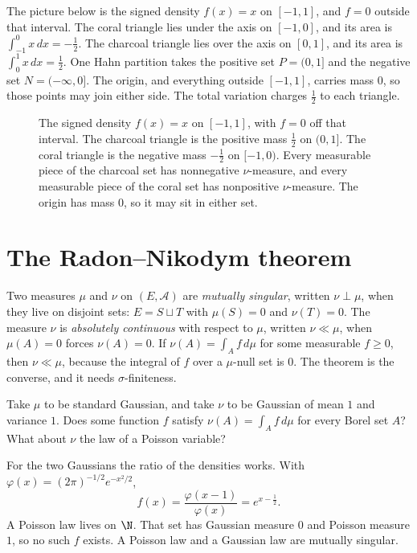 The picture below is the signed density $f(x)=x$ on $[-1,1]$, and $f=0$ outside that interval. The coral triangle lies under the axis on $[-1,0]$, and its area is $\int_{-1}^0 x\,dx=-\frac12$. The charcoal triangle lies over the axis on $[0,1]$, and its area is $\int_0^1 x\,dx=\frac12$. One Hahn partition takes the positive set $P=(0,1]$ and the negative set $N=(-\infty,0]$. The origin, and everything outside $[-1,1]$, carries mass $0$, so those points may join either side. The total variation charges $\frac12$ to each triangle.

\begin{figure}[ht]
\centering
{}
\caption{The signed density $f(x)=x$ on $[-1,1]$, with $f=0$ off that interval. The charcoal triangle is the positive mass $\frac12$ on $(0,1]$. The coral triangle is the negative mass $-\frac12$ on $[-1,0)$. Every measurable piece of the charcoal set has nonnegative $\nu$-measure, and every measurable piece of the coral set has nonpositive $\nu$-measure. The origin has mass $0$, so it may sit in either set.}
\end{figure}

\section{The Radon--Nikodym theorem}

Two measures $\mu$ and $\nu$ on $(E,\mathcal A)$ are \emph{mutually singular}, written $\nu\perp\mu$, when they live on disjoint sets: $E=S\sqcup T$ with $\mu(S)=0$ and $\nu(T)=0$. The measure $\nu$ is \emph{absolutely continuous} with respect to $\mu$, written $\nu\ll\mu$, when $\mu(A)=0$ forces $\nu(A)=0$. If $\nu(A)=\int_Af\,d\mu$ for some measurable $f\ge0$, then $\nu\ll\mu$, because the integral of $f$ over a $\mu$-null set is $0$. The theorem is the converse, and it needs $\sigma$-finiteness.

\begin{think}
Take $\mu$ to be standard Gaussian, and take $\nu$ to be Gaussian of mean $1$ and variance $1$. Does some function $f$ satisfy $\nu(A)=\int_Af\,d\mu$ for every Borel set $A$? What about $\nu$ the law
of a Poisson variable?
\end{think}

For the two Gaussians the ratio of the densities works. With $\varphi(x)=(2\pi)^{-1/2}e^{-x^2/2}$,
\[
f(x)=\frac{\varphi(x-1)}{\varphi(x)}=e^{x-\frac12}.
\]
A Poisson law lives on $\N$. That set has Gaussian measure $0$ and Poisson measure $1$, so no such $f$ exists. A Poisson law and a Gaussian law are mutually singular.

